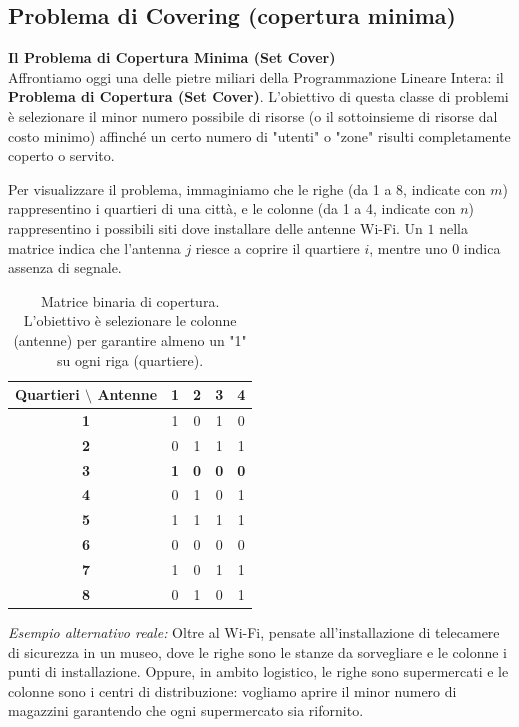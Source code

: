 \documentclass[12pt, a4paper]{article}
\renewcommand{\arraystretch}{1.25}
\begin{document}
	\subsection*{Problema di Covering (copertura minima)}
	
	\textbf{Il Problema di Copertura Minima (Set Cover)}\\
	Affrontiamo oggi una delle pietre miliari della Programmazione Lineare Intera: il \textbf{Problema di Copertura (Set Cover)}. 
	L'obiettivo di questa classe di problemi è selezionare il minor numero possibile di risorse (o il sottoinsieme di risorse dal costo minimo) affinché un certo numero di "utenti" o "zone" risulti completamente coperto o servito.
	
	Per visualizzare il problema, immaginiamo che le righe (da 1 a 8, indicate con $m$) rappresentino i quartieri di una città, e le colonne (da 1 a 4, indicate con $n$) rappresentino i possibili siti dove installare delle antenne Wi-Fi. Un $1$ nella matrice indica che l'antenna $j$ riesce a coprire il quartiere $i$, mentre uno $0$ indica assenza di segnale.
	
	\begin{table}[H]
		\centering
		\renewcommand{\arraystretch}{1.3}
		\begin{tabular}{|c|c|c|c|c|}
			\hline
			\textbf{Quartieri $\setminus$ Antenne} & \textbf{1} & \textbf{2} & \textbf{3} & \textbf{4} \\ \hline
			\textbf{1} & 1 & 0 & 1 & 0 \\ \hline
			\textbf{2} & 0 & 1 & 1 & 1 \\ \hline
			\textbf{3} & \textbf{1} & \textbf{0} & \textbf{0} & \textbf{0} \\ \hline
			\textbf{4} & 0 & 1 & 0 & 1 \\ \hline
			\textbf{5} & 1 & 1 & 1 & 1 \\ \hline
			\textbf{6} & 0 & 0 & 0 & 0 \\ \hline
			\textbf{7} & 1 & 0 & 1 & 1 \\ \hline
			\textbf{8} & 0 & 1 & 0 & 1 \\ \hline
		\end{tabular}
		\caption{Matrice binaria di copertura. L'obiettivo è selezionare le colonne (antenne) per garantire almeno un "1" su ogni riga (quartiere).}
	\end{table}
	
	\textit{Esempio alternativo reale:} Oltre al Wi-Fi, pensate all'installazione di telecamere di sicurezza in un museo, dove le righe sono le stanze da sorvegliare e le colonne i punti di installazione. Oppure, in ambito logistico, le righe sono supermercati e le colonne sono i centri di distribuzione: vogliamo aprire il minor numero di magazzini garantendo che ogni supermercato sia rifornito.
	
\end{document}
